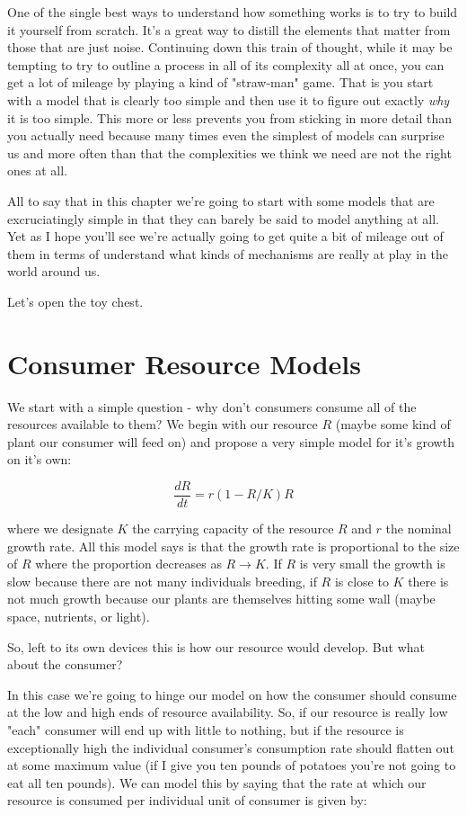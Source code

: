 \documentclass[11pt,a5paper]{book}
\begin{document}
One of the single best ways to understand how something works is to try to build it yourself from scratch. It's a great way to distill the elements that matter from those that are just noise. Continuing down this train of thought, while it may be tempting to try to outline a process in all of its complexity all at once, you can get a lot of mileage by playing a kind of "straw-man" game. That is you start with a model that is clearly too simple and then use it to figure out exactly \textit{why} it is too simple. This more or less prevents you from sticking in more detail than you actually need because many times even the simplest of models can surprise us and more often than that the complexities we think we need are not the right ones at all. 
\newline

All to say that in this chapter we're going to start with some models that are excruciatingly simple in that they can barely be said to model anything at all. Yet as I hope you'll see we're actually going to get quite a bit of mileage out of them in terms of understand what kinds of mechanisms are really at play in the world around us. 
\newline

Let's open the toy chest. 

\section{Consumer Resource Models}

We start with a simple question - why don't consumers consume all of the resources available to them? We begin with our resource $R$ (maybe some kind of plant our consumer will feed on) and propose a very simple model for it's growth on it's own:

$$\frac{dR}{dt} = r(1-R/K)R$$

where we designate $K$ the carrying capacity of the resource $R$ and $r$ the nominal growth rate. All this model says is that the growth rate is proportional to the size of $R$ where the proportion decreases as $R\rightarrow K$. If $R$ is very small the growth is slow because there are not many individuals breeding, if $R$ is close to $K$ there is not much growth because our plants are themselves hitting some wall (maybe space, nutrients, or light). 

So, left to its own devices this is how our resource would develop. But what about the consumer?

In this case we're going to hinge our model on how the consumer should consume at the low and high ends of resource availability. So, if our resource is really low "each" consumer will end up with little to nothing, but if the resource is exceptionally high the individual consumer's consumption rate should flatten out at some maximum value (if I give you ten pounds of potatoes you're not going to eat all ten pounds). We can model this by saying that the rate at which our resource is consumed per individual unit of consumer is given by:
\end{document}
